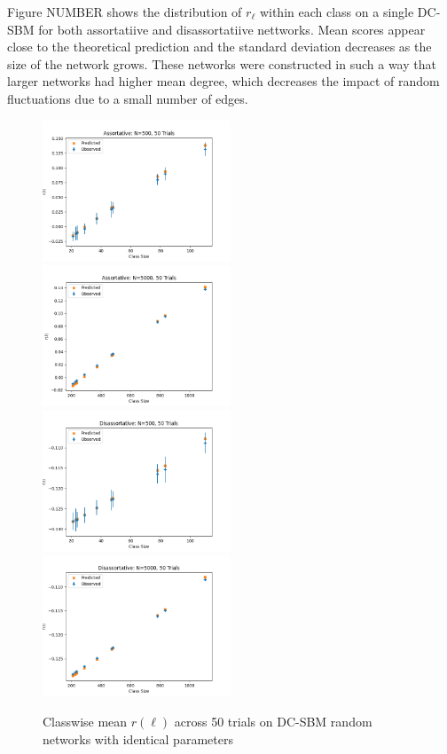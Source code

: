 \documentclass[12pt]{article}
\begin{document}
Figure NUMBER shows the distribution of $r_\ell$ within each class on a single DC-SBM for both assortatiive and disassortatiive nettworks.  Mean scores appear close to the theoretical prediction and the standard deviation decreases as the size of the network grows.  These networks were constructed in such a way that larger networks had higher mean degree, which decreases the impact of random fluctuations due to a small number of edges.  

\begin{figure}[h!]
\includegraphics[width=0.5\textwidth]{assortative_N_500_trials_50.png}
\includegraphics[width=0.5\textwidth]{assortative_N_5000_trials_50.png}
\includegraphics[width=0.5\textwidth]{disassortative_N_500_trials_50.png}
\includegraphics[width=0.5\textwidth]{disassortative_N_5000_trials_50.png}
\caption{Classwise mean $r(\ell)$ across 50 trials on DC-SBM random networks with identical parameters}
\end{figure}
\end{document}
